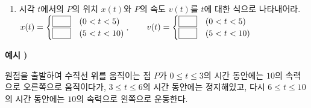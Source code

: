 \documentclass{oblivoir}
\newcounter{num}
\newcommand\exam[1]
{\bigskip\par\noindent\stepcounter{num} \textbf{예시 \thenum) #1}\par\noindent}
\newcommand\pb[1]{\ensuremath{\fbox{\phantom{#1}}}}
\begin{document}
\begin{enumerate}[label=(\(\arabic*\))]
\item
시각 \(t\)에서의 \(P\)의 위치 \(x(t)\)와 \(P\)의 속도 \(v(t)\)를 \(t\)에 대한 식으로 나타내어라.\\
\(x(t)=\begin{cases}\pb{111}&(0<t<5)\\\pb{111}&(5<t<10)\end{cases},\qquad
v(t)=\begin{cases}\pb{111}&(0<t<5)\\\pb{111}&(5<t<10)\end{cases}\)
\end{enumerate}

\clearpage
%
\exam{}
원점을 출발하여 수직선 위를 움직이는 점 \(P\)가 \(0\le t\le 3\)의 시간 동안에는 \(10\)의 속력으로 오른쪽으로 움직이다가, \(3\le t\le 6\)의 시간 동안에는 정지해있고, 다시 \(6\le t\le 10\)의 시간 동안에는 \(10\)의 속력으로 왼쪽으로 운동한다.
\end{document}

